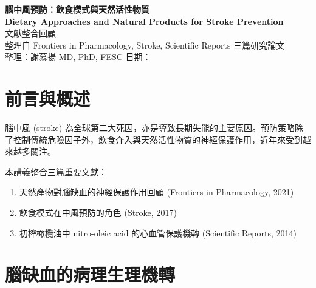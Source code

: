 \documentclass[12pt,a4paper]{article}
\begin{document}
\begin{center}
{\LARGE\bfseries\textcolor{emergency_red}{腦中風預防：飲食模式與天然活性物質}}\\[0.5cm]
{\Large\textbf{Dietary Approaches and Natural Products for Stroke Prevention}}\\[0.3cm]
{\large 文獻整合回顧}\\[0.5cm]
{\normalsize 整理自 Frontiers in Pharmacology, Stroke, Scientific Reports 三篇研究論文}\\[0.3cm]
{\normalsize 整理：謝慕揚 MD, PhD, FESC \quad 日期：\mydate}
\end{center}

\tableofcontents
\newpage

\section{前言與概述}

腦中風 (stroke) 為全球第二大死因，亦是導致長期失能的主要原因。預防策略除了控制傳統危險因子外，飲食介入與天然活性物質的神經保護作用，近年來受到越來越多關注。

本講義整合三篇重要文獻：
\begin{enumerate}
    \item 天然產物對腦缺血的神經保護作用回顧 (Frontiers in Pharmacology, 2021)
    \item 飲食模式在中風預防的角色 (Stroke, 2017)
    \item 初榨橄欖油中 nitro-oleic acid 的心血管保護機轉 (Scientific Reports, 2014)
\end{enumerate}


\section{腦缺血的病理生理機轉}
\end{document}
